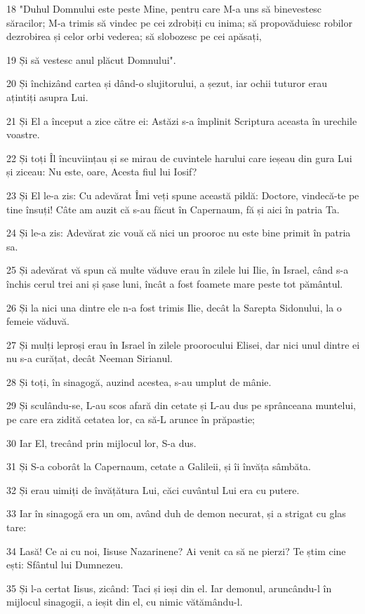 \par 18 "Duhul Domnului este peste Mine, pentru care M-a uns să binevestesc săracilor; M-a trimis să vindec pe cei zdrobiți cu inima; să propovăduiesc robilor dezrobirea și celor orbi vederea; să slobozesc pe cei apăsați,
\par 19 Și să vestesc anul plăcut Domnului".
\par 20 Și închizând cartea și dând-o slujitorului, a șezut, iar ochii tuturor erau ațintiți asupra Lui.
\par 21 Și El a început a zice către ei: Astăzi s-a împlinit Scriptura aceasta în urechile voastre.
\par 22 Și toți Îl încuviințau și se mirau de cuvintele harului care ieșeau din gura Lui și ziceau: Nu este, oare, Acesta fiul lui Iosif?
\par 23 Și El le-a zis: Cu adevărat Îmi veți spune această pildă: Doctore, vindecă-te pe tine însuți! Câte am auzit că s-au făcut în Capernaum, fă și aici în patria Ta.
\par 24 Și le-a zis: Adevărat zic vouă că nici un prooroc nu este bine primit în patria sa.
\par 25 Și adevărat vă spun că multe văduve erau în zilele lui Ilie, în Israel, când s-a închis cerul trei ani și șase luni, încât a fost foamete mare peste tot pământul.
\par 26 Și la nici una dintre ele n-a fost trimis Ilie, decât la Sarepta Sidonului, la o femeie văduvă.
\par 27 Și mulți leproși erau în Israel în zilele proorocului Elisei, dar nici unul dintre ei nu s-a curățat, decât Neeman Sirianul.
\par 28 Și toți, în sinagogă, auzind acestea, s-au umplut de mânie.
\par 29 Și sculându-se, L-au scos afară din cetate și L-au dus pe sprânceana muntelui, pe care era zidită cetatea lor, ca să-L arunce în prăpastie;
\par 30 Iar El, trecând prin mijlocul lor, S-a dus.
\par 31 Și S-a coborât la Capernaum, cetate a Galileii, și îi învăța sâmbăta.
\par 32 Și erau uimiți de învățătura Lui, căci cuvântul Lui era cu putere.
\par 33 Iar în sinagogă era un om, având duh de demon necurat, și a strigat cu glas tare:
\par 34 Lasă! Ce ai cu noi, Iisuse Nazarinene? Ai venit ca să ne pierzi? Te știm cine ești: Sfântul lui Dumnezeu.
\par 35 Și l-a certat Iisus, zicând: Taci și ieși din el. Iar demonul, aruncându-l în mijlocul sinagogii, a ieșit din el, cu nimic vătămându-l.
